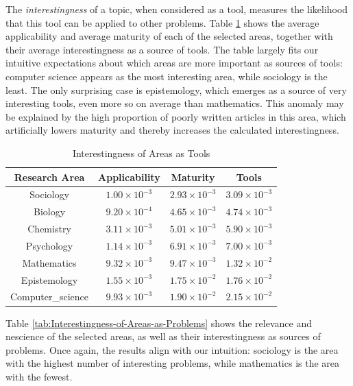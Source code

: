 The \emph{interestingness} of a topic, when considered as a tool, measures the likelihood that this tool can be applied to other problems. Table \ref{tab:Interestingness-of-Areas-as-Tools} shows the average applicability and average maturity of each of the selected areas, together with their average interestingness as a source of tools. The table largely fits our intuitive expectations about which areas are more important as sources of tools: computer science appears as the most interesting area, while sociology is the least. The only surprising case is epistemology, which emerges as a source of very interesting tools, even more so on average than mathematics. This anomaly may be explained by the high proportion of poorly written articles in this area, which artificially lowers maturity and thereby increases the calculated interestingness.

\begin{table}
\begin{centering}
\begin{tabular}{|c|c|c|c|}
\hline 
Research Area & Applicability & Maturity & Tools\tabularnewline
\hline 
\hline 
Sociology & $1.00\times10^{-3}$ & $2.93\times10^{-3}$ & $3.09\times10^{-3}$\tabularnewline
\hline 
Biology & $9.20\times10^{-4}$ & $4.65\times10^{-3}$ & $4.74\times10^{-3}$\tabularnewline
\hline 
Chemistry & $3.11\times10^{-3}$ & $5.01\times10^{-3}$ & $5.90\times10^{-3}$\tabularnewline
\hline 
Psychology & $1.14\times10^{-3}$ & $6.91\times10^{-3}$ & $7.00\times10^{-3}$\tabularnewline
\hline 
Mathematics & $9.32\times10^{-3}$ & $9.47\times10^{-3}$ & $1.32\times10^{-2}$\tabularnewline
\hline 
Epistemology & $1.55\times10^{-3}$ & $1.75\times10^{-2}$ & $1.76\times10^{-2}$\tabularnewline
\hline 
Computer\_science & $9.93\times10^{-3}$ & $1.90\times10^{-2}$ & $2.15\times10^{-2}$\tabularnewline
\hline 
\end{tabular}
\par\end{centering}

\caption{\label{tab:Interestingness-of-Areas-as-Tools}Interestingness of Areas
as Tools}
\end{table}

Table \ref{tab:Interestingness-of-Areas-as-Problems} shows the relevance and nescience of the selected areas, as well as their interestingness as sources of problems. Once again, the results align with our intuition: sociology is the area with the highest number of interesting problems, while mathematics is the area with the fewest.

